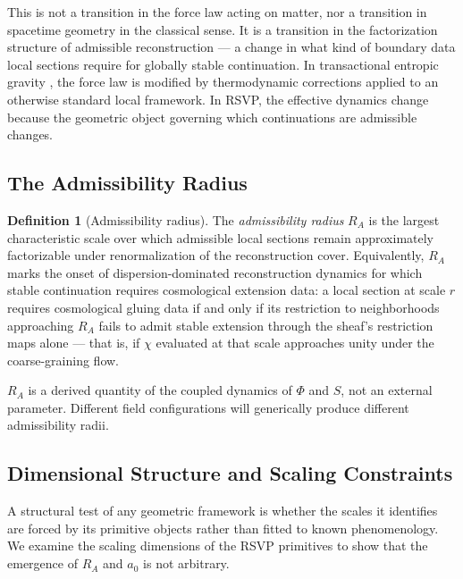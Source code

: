 \documentclass[11pt, a4paper]{article}
\theoremstyle{plain}
\theoremstyle{definition}
\newtheorem{definition}[theorem]{Definition}
\theoremstyle{remark}
\newcommand{\RA}{R_{\!A}}
\begin{document}
This is not a transition in the force law acting on matter, nor a transition in
spacetime geometry in the classical sense. It is a transition in the factorization
structure of admissible reconstruction --- a change in what kind of boundary data
local sections require for globally stable continuation. In transactional entropic
gravity \cite{kastner2024}, the force law is modified by thermodynamic corrections
applied to an otherwise standard local framework. In RSVP, the effective dynamics
change because the geometric object governing which continuations are admissible
changes.

\subsection{The Admissibility Radius}

\begin{definition}[Admissibility radius]
\label{def:RA}
The \emph{admissibility radius} $\RA$ is the largest characteristic scale over which
admissible local sections remain approximately factorizable under renormalization of
the reconstruction cover. Equivalently, $\RA$ marks the onset of
dispersion-dominated reconstruction dynamics for which stable continuation requires
cosmological extension data: a local section at scale $r$ requires cosmological
gluing data if and only if its restriction to neighborhoods approaching $\RA$ fails
to admit stable extension through the sheaf's restriction maps alone --- that is, if
$\chi$ evaluated at that scale approaches unity under the coarse-graining flow.
\end{definition}

$\RA$ is a derived quantity of the coupled dynamics of $\Phi$ and $S$, not an
external parameter. Different field configurations will generically produce different
admissibility radii.

\subsection{Dimensional Structure and Scaling Constraints}
\label{sec:dimensional}

A structural test of any geometric framework is whether the scales it identifies are
forced by its primitive objects rather than fitted to known phenomenology. We examine
the scaling dimensions of the RSVP primitives to show that the emergence of $\RA$ and
$a_0$ is not arbitrary.
\end{document}

